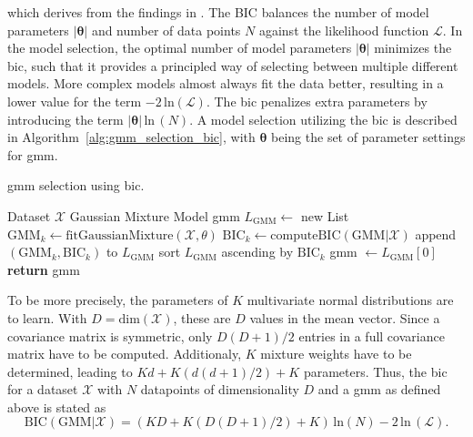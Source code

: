 \documentclass[../../../main.tex]{subfiles}
\begin{document}
which derives from the findings in \cite{schwarz1978estimating}. The BIC balances the number of model parameters $|\bm{\theta}|$ and number of data points $N$ against the likelihood function $\mathcal{L}$. In the model selection, the optimal number of model parameters $|\bm{\theta}|$ minimizes the \gls{bic}, such that it provides a principled way of selecting between multiple different models. More complex models almost always fit the data better, resulting in a lower value for the term $-2 \, \text{ln}(\mathcal{L})$. The \gls{bic} penalizes extra parameters by introducing the term $|\bm{\theta}| \, \text{ln} \, (N)$. A model selection utilizing the \gls{bic} is described in Algorithm~\ref{alg:gmm_selection_bic}, with $\bm{\theta}$ being the set of parameter settings for \gls{gmm}.

\begin{algorithm}
    \caption[\gls{gmm} selection using \gls{bic}]{\gls{gmm} selection using \gls{bic}.}
    \label{alg:gmm_selection_bic}
    \begin{algorithmic}[1]
        \REQUIRE Dataset $\mathcal{X}$
        \ENSURE Gaussian Mixture Model \gls{gmm}
        \STATE $L_{\text{GMM}} \leftarrow$ new List
            \STATE $\text{GMM}_k \leftarrow \text{fitGaussianMixture}(\mathcal{X}, \theta)$
            \STATE $\text{BIC}_k \leftarrow \text{computeBIC}(\text{GMM}|\mathcal{X})$
            \STATE append $(\text{GMM}_k, \text{BIC}_k)$ to $L_{\text{GMM}}$
        \ENDFOR
        \STATE sort $L_{\text{GMM}}$ ascending by $\text{BIC}_k$ 
        \STATE \gls{gmm} $\leftarrow L_{\text{GMM}}[0]$ 
        \STATE \textbf{return} \gls{gmm} 
    \end{algorithmic}
 \end{algorithm}

To be more precisely, the parameters of $K$ multivariate normal distributions are to learn. With $D = \text{dim}(\mathcal{X})$, these are $D$ values in the mean vector. Since a covariance matrix is symmetric, only $D(D+1)/2$ entries in a full covariance matrix have to be computed. Additionaly, $K$ mixture weights have to be determined, leading to $Kd + K(d(d+1)/2)+K$ parameters. Thus, the \gls{bic} for a dataset $\mathcal{X}$ with $N$ datapoints of dimensionality $D$ and a \gls{gmm} as defined above is stated as 
\begin{equation}\label{eq:bic}
    \text{BIC}(\text{GMM}|\mathcal{X}) = (KD + K(D(D+1)/2)+K) \, \text{ln}(N) - 2 \, \text{ln} \, (\mathcal{L}).
\end{equation}
\end{document}
